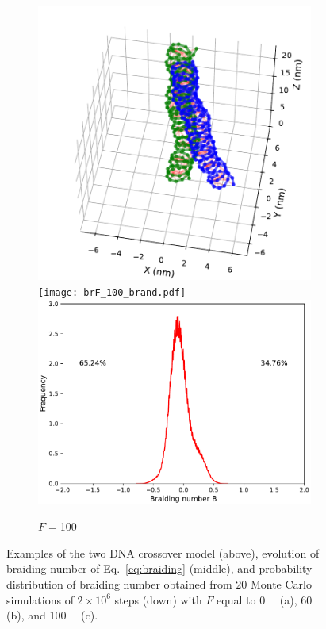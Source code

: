 \documentclass[a4paper,10pt]{article}
\begin{document}
\begin{figure}[htbp]
\begin{subfigure}{.3\textwidth}
\includegraphics[width=\textwidth]{brF_100_2000000.pdf}
\texttt{[image: brF\_100\_brand.pdf]}
\includegraphics[width=\textwidth]{brF_100_br_pr.pdf}
\caption{$F=$\SI{100}{\pico\neuton}}
\label{fig:braF_c}
\end{subfigure}
\caption{Examples of the two DNA crossover model (above), evolution of braiding number of Eq.~\ref{eq:braiding} (middle), and probability distribution of braiding number obtained from $20$ Monte Carlo simulations of $2\times 10^6$ steps (down) with $F$ equal to \SI{0}{\pico\neuton} (a), \SI{60}{\pico\neuton} (b), and \SI{100}{\pico\neuton} (c).}
\label{fig:braF}
\end{figure}
\end{document}
